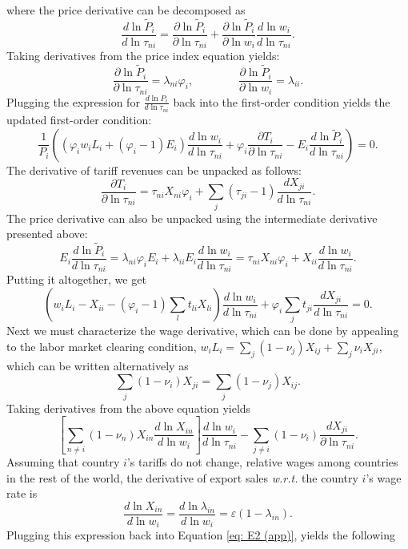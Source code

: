 \documentclass[12pt]{article}
\begin{document}
where the price derivative can be decomposed as
\[
\frac{d\ln \tilde{P}_{i}}{d\ln\tau_{ni}}=\frac{\partial\ln \tilde{P}_{i}}{\partial\ln\tau_{ni}}+\frac{\partial\ln \tilde{P}_{i}}{\partial\ln w_{i}}\frac{d\ln w_{i}}{d\ln\tau_{ni}}.
\]
Taking derivatives from the price index equation yields:
\[
\frac{\partial\ln \tilde{P}_{i}}{\partial\ln\tau_{ni}}=\lambda_{ni}\varphi_{i},\qquad\qquad\frac{\partial\ln \tilde{P}_{i}}{\partial\ln w_{i}}=\lambda_{ii}.
\]
Plugging the expression for $\frac{d\ln P_{i}}{d\ln\tau_{ni}}$ back into the first-order condition yields the updated first-order condition:
\[
\frac{1}{P_{i}}\left(\left(\varphi_{i}w_{i}L_{i}+(\varphi_{i}-1)E_{i}\right)\frac{d\ln w_{i}}{d\ln\tau_{ni}}+\varphi_{i}\frac{\partial T_{i}}{\partial\ln\tau_{ni}}-E_{i}\frac{d\ln\tilde{P}_{i}}{d\ln\tau_{ni}}\right)=0.
\]
The derivative of  tariff revenues can be unpacked as follows:
\[
\frac{\partial T_{i}}{\partial\ln\tau_{ni}}=\tau_{ni}X_{ni}\varphi_i+\sum_{j}\left(\tau_{ji}-1\right)\frac{d X_{ji}}{d\ln\tau_{ni}}.
\]
The price derivative can also be unpacked using the intermediate derivative presented above:
\[
E_{i}\frac{d\ln \tilde{P}_{i}}{d\ln\tau_{ni}}=\lambda_{ni}\varphi_iE_{i}+\lambda_{ii}E_{i}\frac{d\ln w_{i}}{d\ln\tau_{ni}}=\tau_{ni}X_{ni}\varphi_i+X_{ii}\frac{d\ln w_{i}}{d\ln\tau_{ni}}.
\]
Putting it altogether, we get
\begin{equation} \label{eq: E1 (app)}
\left(w_{i}L_{i}-X_{ii}-(\varphi_{i}-1)\sum_{l}t_{li}X_{li}\right)\frac{d\ln w_{i}}{d\ln\tau_{ni}}+\varphi_{i}\sum_{j}t_{ji}\frac{dX_{ji}}{d\ln\tau_{ni}}=0.
\end{equation}
Next we must characterize the wage derivative, which can be done by appealing to the labor market clearing condition, $w_{i}L_{i}=\sum_{j}(1-\nu_{j})X_{ij}+\sum_{j}\nu_{i}X_{ji}$, which can be written alternatively as
\[
\sum_{j}(1-\nu_{i})X_{ji}=\sum_{j}(1-\nu_{j})X_{ij}.
\]
Taking derivatives from the above equation yields
\begin{equation} \label{eq: E2 (app)}
    \left[\sum_{n\neq i}(1-\nu_{n})X_{in}\frac{d\ln X_{in}}{d\ln w_{i}}\right]\frac{d\ln w_{i}}{d\ln\tau_{ni}}-\sum_{j\neq i}(1-\nu_{i})\frac{dX_{ji}}{\partial\ln\tau_{ni}}.
\end{equation}
Assuming that country $i$'s tariffs do not change, relative wages among countries in the rest of the world, the derivative of export sales \textit{w.r.t.} the country $i$'s wage rate is
\[\frac{d\ln X_{in}}{d\ln w_{i}}=\frac{d\ln\lambda_{in}}{d\ln w_{i}}=\varepsilon\left(1-\lambda_{in}\right).
\]
Plugging this expression back into Equation \ref{eq: E2 (app)}, yields the following
\end{document}
